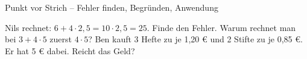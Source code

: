 \begin{aufgabe}{Punkt vor Strich – Fehler finden, Begründen, Anwendung}
\begin{teile}
\teil Nils rechnet: $6 + 4 \cdot 2{,}5 = 10 \cdot 2{,}5 = 25$. Finde den Fehler.
\teil Warum rechnet man bei $3 + 4 \cdot 5$ zuerst $4 \cdot 5$?
\teil Ben kauft 3 Hefte zu je 1,20 € und 2 Stifte zu je 0,85 €. Er hat 5 € dabei. Reicht das Geld?
\end{teile}
\end{aufgabe}
